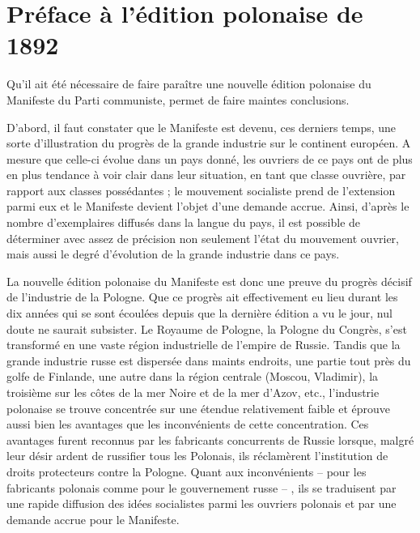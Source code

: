 \documentclass[french,twoside]{book} %
\newcommand{\byline}[1]{\bigskip{\RaggedLeft{#1}\par}\bigskip}
\begin{document}
\byline{Friedrich Engels ; \\
Londres, 1er mai 1890}
\section[Préface à l’édition polonaise de 1892]{Préface à l’édition polonaise de 1892}
\noindent Qu'il ait été nécessaire de faire paraître une nouvelle édition polonaise du Manifeste du Parti communiste, permet de faire maintes conclusions.\par
D'abord, il faut constater que le Manifeste est devenu, ces derniers temps, une sorte d’illustration du progrès de la grande industrie sur le continent européen. A mesure que celle-ci évolue dans un pays donné, les ouvriers de ce pays ont de plus en plus tendance à voir clair dans leur situation, en tant que classe ouvrière, par rapport aux classes possédantes ; le mouvement socialiste prend de l’extension parmi eux et le Manifeste devient l’objet d’une demande accrue. Ainsi, d’après le nombre d’exemplaires diffusés dans la langue du pays, il est possible de déterminer avec assez de précision non seulement l’état du mouvement ouvrier, mais aussi le degré d’évolution de la grande industrie dans ce pays.\par
La nouvelle édition polonaise du Manifeste est donc une preuve du progrès décisif de l’industrie de la Pologne. Que ce progrès ait effectivement eu lieu durant les dix années qui se sont écoulées depuis que la dernière édition a vu le jour, nul doute ne saurait subsister. Le Royaume de Pologne, la Pologne du Congrès, s’est transformé en une vaste région industrielle de l’empire de Russie. Tandis que la grande industrie russe est dispersée dans maints endroits, une partie tout près du golfe de Finlande, une autre dans la région centrale (Moscou, Vladimir), la troisième sur les côtes de la mer Noire et de la mer d’Azov, etc., l’industrie polonaise se trouve concentrée sur une étendue relativement faible et éprouve aussi bien les avantages que les inconvénients de cette concentration. Ces avantages furent reconnus par les fabricants concurrents de Russie lorsque, malgré leur désir ardent de russifier tous les Polonais, ils réclamèrent l’institution de droits protecteurs contre la Pologne. Quant aux inconvénients – pour les fabricants polonais comme pour le gouvernement russe – , ils se traduisent par une rapide diffusion des idées socialistes parmi les ouvriers polonais et par une demande accrue pour le Manifeste.\par
\end{document}
